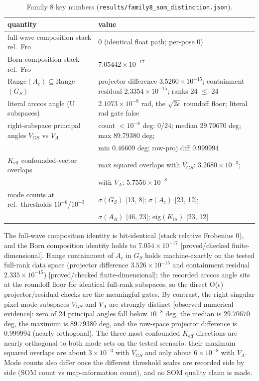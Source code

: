 \documentclass[12pt]{article}
\newcommand{\FDL}{\textnormal{[proved/checked finite-dimensional]}}
\newcommand{\OBS}{\textnormal{[observed numerical evidence]}}
\begin{document}
\begin{table}[htbp]
\centering
\small
\caption{Family 8 key numbers
(\texttt{results/family8\_som\_distinction.json}).}
\label{tab:f8}
\begin{tabular}{l l}
\toprule
quantity & value \\
\midrule
full-wave composition stack rel.\ Fro &
0 (identical float path; per-pose 0) \\
Born composition stack rel.\ Fro & $7.05442\times10^{-17}$ \\
Range$(A_c)\subseteq$Range$(G_S)$ &
projector difference $3.5260\times10^{-15}$; containment residual
$2.3354\times10^{-15}$; ranks 24 $\le$ 24 \\
literal arccos angle (U subspaces) &
$2.1073\times10^{-8}$ rad, the $\sqrt{2\epsilon}$ roundoff floor;
literal rad gate false \\
right-subspace principal angles $V_{GS}$ vs $V_A$ &
count $<10^{-8}$ deg: 0/24; median $29.70670$ deg; max $89.79380$ deg; \\
 & min $0.46609$ deg; row-proj diff 0.999994 \\
$K_{\mathrm{eff}}$ confounded-vector overlaps &
max squared overlaps with $V_{GS}$: $3.2680\times10^{-3}$; \\
 & with $V_A$: $5.7556\times10^{-8}$ \\
mode counts at rel.\ thresholds $10^{-6}$/$10^{-3}$ &
$\sigma(G_S)$ [13, 8]; $\sigma(A_c)$ [23, 12]; \\
 & $\sigma(A_R)$ [46, 23]; eig$(K_{\mathrm{IS}})$ [23, 12] \\
\bottomrule
\end{tabular}
\end{table}

The full-wave composition identity is bit-identical (stack relative Frobenius
0), and the Born composition identity holds to $7.054\times10^{-17}$
\FDL{}. Range containment of $A_c$ in $G_S$ holds machine-exactly on the
tested full-rank data space (projector difference $3.526\times10^{-15}$ and
containment residual $2.335\times10^{-15}$) \FDL{}; the recorded arccos angle
sits at the roundoff floor for identical full-rank subspaces, so the direct
O($\epsilon$) projector/residual checks are the meaningful gates. By contrast,
the right singular pixel-mode subspaces $V_{GS}$ and $V_A$ are strongly
distinct \OBS{}: zero of 24 principal angles fall below $10^{-8}$ deg, the
median is $29.70670$ deg, the maximum is $89.79380$ deg, and the row-space
projector difference is 0.999994 (nearly orthogonal). The three most
confounded $K_{\mathrm{eff}}$ directions are nearly orthogonal to both mode
sets on the tested scenario: their maximum squared overlaps are about
$3\times10^{-3}$ with $V_{GS}$ and only about $6\times10^{-8}$ with $V_A$.
Mode counts also differ once the different threshold scales are recorded
side by side (SOM count vs map-information count), and no SOM quality claim
is made.
\end{document}
